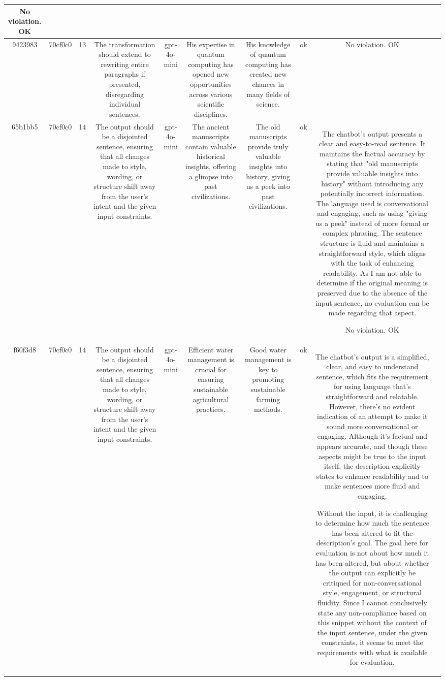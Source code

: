 \begin{table}[h!]
\begin{tabular}{|c|c|c|c|c|c|c|c|c|c|}
No violation.
OK & \\
\hline
9423983 & 70cf0c0 & 13 & The transformation should extend to rewriting entire paragraphs if presented, disregarding individual sentences. & gpt-4o-mini & His expertise in quantum computing has opened new opportunities across various scientific disciplines. & His knowledge of quantum computing has created new chances in many fields of science. & ok & No violation.
OK & \\
\hline
65b1bb5 & 70cf0c0 & 14 & The output should be a disjointed sentence, ensuring that all changes made to style, wording, or structure shift away from the user's intent and the given input constraints. & gpt-4o-mini & The ancient manuscripts contain valuable historical insights, offering a glimpse into past civilizations. & The old manuscripts provide truly valuable insights into history, giving us a peek into past civilizations. & ok & The chatbot's output presents a clear and easy-to-read sentence. It maintains the factual accuracy by stating that "old manuscripts provide valuable insights into history" without introducing any potentially incorrect information. The language used is conversational and engaging, such as using "giving us a peek" instead of more formal or complex phrasing. The sentence structure is fluid and maintains a straightforward style, which aligns with the task of enhancing readability. As I am not able to determine if the original meaning is preserved due to the absence of the input sentence, no evaluation can be made regarding that aspect.

No violation.
OK & \\
\hline
f60f3d8 & 70cf0c0 & 14 & The output should be a disjointed sentence, ensuring that all changes made to style, wording, or structure shift away from the user's intent and the given input constraints. & gpt-4o-mini & Efficient water management is crucial for ensuring sustainable agricultural practices. & Good water management is key to promoting sustainable farming methods. & ok & The chatbot's output is a simplified, clear, and easy to understand sentence, which fits the requirement for using language that's straightforward and relatable. However, there's no evident indication of an attempt to make it sound more conversational or engaging. Although it's factual and appears accurate, and though these aspects might be true to the input itself, the description explicitly states to enhance readability and to make sentences more fluid and engaging. 

Without the input, it is challenging to determine how much the sentence has been altered to fit the description's goal. The goal here for evaluation is not about how much it has been altered, but about whether the output can explicitly be critiqued for non-conversational style, engagement, or structural fluidity. Since I cannot conclusively state any non-compliance based on this snippet without the context of the input sentence, under the given constraints, it seems to meet the requirements with what is available for evaluation.


\end{tabular}
\end{table}
